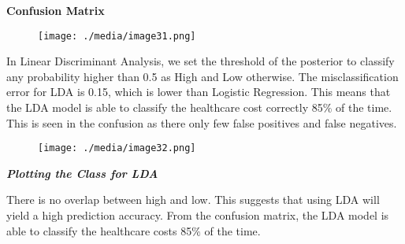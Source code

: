 \documentclass[12pt]{article}
\begin{document}
\vspace{\baselineskip}

\vspace{\baselineskip}
\begin{justify}
\textbf{Confusion Matrix}
\end{justify}\par




\begin{figure}[H]
	\begin{Center}
		\texttt{[image: ./media/image31.png]}
	\end{Center}
\end{figure}



\par


\vspace{\baselineskip}
\begin{justify}
In Linear Discriminant Analysis, we set the threshold of the posterior to classify any probability higher than 0.5 as High and Low otherwise. The misclassification error for LDA is 0.15, which is lower than Logistic Regression. This means that the LDA model is able to classify the healthcare cost correctly 85$\%$  of the time. This is seen in the confusion as there only few false positives and false negatives.
\end{justify}\par




\begin{figure}[H]
\advance\leftskip -1.05in		\texttt{[image: ./media/image32.png]}
\end{figure}



\begin{justify}
\textbf{\textit{Plotting the Class for LDA}}
\end{justify}\par

\begin{justify}
There is no overlap between high and low. This suggests that using LDA will yield a high prediction accuracy. From the confusion matrix, the LDA model is able to classify the healthcare costs 85$\%$  of the time.
\end{justify}\par
\end{document}
